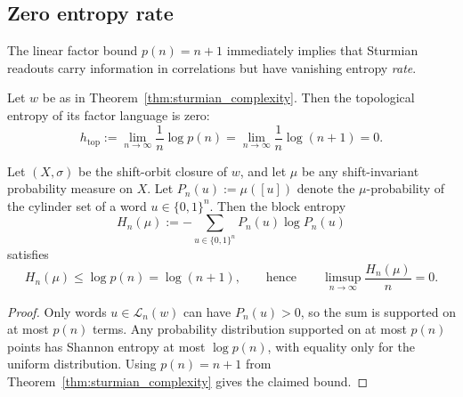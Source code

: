 \subsection{Zero entropy rate}
\label{app:sturmian_entropy_rate}
The linear factor bound $p(n)=n+1$ immediately implies that Sturmian
readouts carry information in correlations but have vanishing entropy
\emph{rate}.

\begin{corollary}
\label{cor:sturmian_top_entropy}
Let $w$ be as in Theorem~\ref{thm:sturmian_complexity}.
Then the topological entropy of its factor language is zero:
\[
h_{\mathrm{top}}
:=\lim_{n\to\infty}\frac{1}{n}\log p(n)
=\lim_{n\to\infty}\frac{1}{n}\log(n+1)
=0.
\]
\end{corollary}

\begin{corollary}
\label{cor:sturmian_shannon_entropy}
Let $(X,\sigma)$ be the shift-orbit closure of $w$, and let $\mu$ be any
shift-invariant probability measure on $X$.
Let $P_n(u):=\mu([u])$ denote the $\mu$-probability of the cylinder set
of a word $u\in\{0,1\}^n$.
Then the block entropy
\[
H_n(\mu):=-\sum_{u\in\{0,1\}^n} P_n(u)\log P_n(u)
\]
satisfies
\[
H_n(\mu)\le \log p(n)=\log(n+1),
\qquad\text{hence}\qquad
\limsup_{n\to\infty}\frac{H_n(\mu)}{n}=0.
\]
\end{corollary}
\begin{proof}
Only words $u\in\mathcal{L}_n(w)$ can have $P_n(u)>0$, so the sum is
supported on at most $p(n)$ terms.
Any probability distribution supported on at most $p(n)$ points has
Shannon entropy at most $\log p(n)$, with equality only for the uniform
distribution.
Using $p(n)=n+1$ from Theorem~\ref{thm:sturmian_complexity} gives the
claimed bound.
\end{proof}


